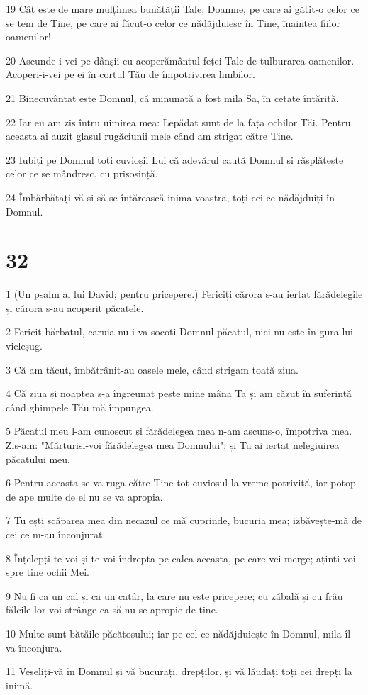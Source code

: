 \par 19 Cât este de mare mulțimea bunătății Tale, Doamne, pe care ai gătit-o celor ce se tem de Tine, pe care ai făcut-o celor ce nădăjduiesc în Tine, înaintea fiilor oamenilor!
\par 20 Ascunde-i-vei pe dânșii cu acoperământul feței Tale de tulburarea oamenilor. Acoperi-i-vei pe ei în cortul Tău de împotrivirea limbilor.
\par 21 Binecuvântat este Domnul, că minunată a fost mila Sa, în cetate întărită.
\par 22 Iar eu am zis întru uimirea mea: Lepădat sunt de la fața ochilor Tăi. Pentru aceasta ai auzit glasul rugăciunii mele când am strigat către Tine.
\par 23 Iubiți pe Domnul toți cuvioșii Lui că adevărul caută Domnul și răsplătește celor ce se mândresc, cu prisosință.
\par 24 Îmbărbătați-vă și să se întărească inima voastră, toți cei ce nădăjduiți în Domnul.

\chapter{32}

\par 1 (Un psalm al lui David; pentru pricepere.) Fericiți cărora s-au iertat fărădelegile și cărora s-au acoperit păcatele.
\par 2 Fericit bărbatul, căruia nu-i va socoti Domnul păcatul, nici nu este în gura lui vicleșug.
\par 3 Că am tăcut, îmbătrânit-au oasele mele, când strigam toată ziua.
\par 4 Că ziua și noaptea s-a îngreunat peste mine mâna Ta și am căzut în suferință când ghimpele Tău mă împungea.
\par 5 Păcatul meu l-am cunoscut și fărădelegea mea n-am ascuns-o, împotriva mea. Zis-am: "Mărturisi-voi fărădelegea mea Domnului"; și Tu ai iertat nelegiuirea păcatului meu.
\par 6 Pentru aceasta se va ruga către Tine tot cuviosul la vreme potrivită, iar potop de ape multe de el nu se va apropia.
\par 7 Tu ești scăparea mea din necazul ce mă cuprinde, bucuria mea; izbăvește-mă de cei ce m-au înconjurat.
\par 8 Înțelepți-te-voi și te voi îndrepta pe calea aceasta, pe care vei merge; aținti-voi spre tine ochii Mei.
\par 9 Nu fi ca un cal și ca un catâr, la care nu este pricepere; cu zăbală și cu frâu fălcile lor voi strânge ca să nu se apropie de tine.
\par 10 Multe sunt bătăile păcătosului; iar pe cel ce nădăjduiește în Domnul, mila îl va înconjura.
\par 11 Veseliți-vă în Domnul și vă bucurați, drepților, și vă lăudați toți cei drepți la inimă.

